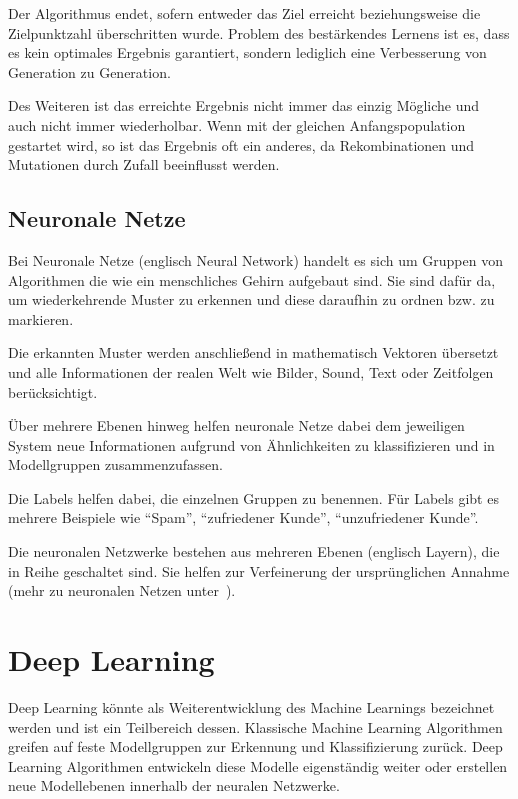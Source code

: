 Der Algorithmus endet, sofern entweder das Ziel erreicht beziehungsweise die Zielpunktzahl überschritten wurde. Problem
des bestärkendes Lernens ist es, dass es kein optimales Ergebnis garantiert, sondern lediglich eine Verbesserung von
Generation zu Generation.

Des Weiteren ist das erreichte Ergebnis nicht immer das einzig Mögliche und auch nicht immer wiederholbar. Wenn mit der
gleichen Anfangspopulation gestartet wird, so ist das Ergebnis oft ein anderes, da Rekombinationen und Mutationen durch
Zufall beeinflusst werden.

\subsection{Neuronale Netze}
Bei Neuronale Netze (englisch Neural Network) handelt es sich um Gruppen von Algorithmen die wie ein menschliches Gehirn
aufgebaut sind. Sie sind dafür da, um wiederkehrende Muster zu erkennen und diese daraufhin zu ordnen bzw. zu markieren.

Die erkannten Muster werden anschließend in mathematisch Vektoren übersetzt und alle Informationen der realen Welt wie
Bilder, Sound, Text oder Zeitfolgen berücksichtigt.

Über mehrere Ebenen hinweg helfen neuronale Netze dabei dem jeweiligen System neue Informationen aufgrund von
Ähnlichkeiten zu klassifizieren und in Modellgruppen zusammenzufassen.

Die Labels helfen dabei, die einzelnen Gruppen zu benennen. Für Labels gibt es mehrere Beispiele wie \enquote{Spam},
\enquote{zufriedener Kunde}, \enquote{unzufriedener Kunde}.

Die neuronalen Netzwerke bestehen aus mehreren Ebenen (englisch Layern), die in Reihe geschaltet sind. Sie helfen zur
Verfeinerung der ursprünglichen Annahme (mehr zu neuronalen Netzen unter~\cite{book_grundlagen_neuronalenetze}).

\section{Deep Learning}
Deep Learning könnte als Weiterentwicklung des Machine Learnings bezeichnet werden und ist ein Teilbereich dessen.
Klassische Machine Learning Algorithmen greifen auf feste Modellgruppen zur Erkennung und Klassifizierung zurück. Deep
Learning Algorithmen entwickeln diese Modelle eigenständig weiter oder erstellen neue Modellebenen innerhalb der
neuralen Netzwerke.

